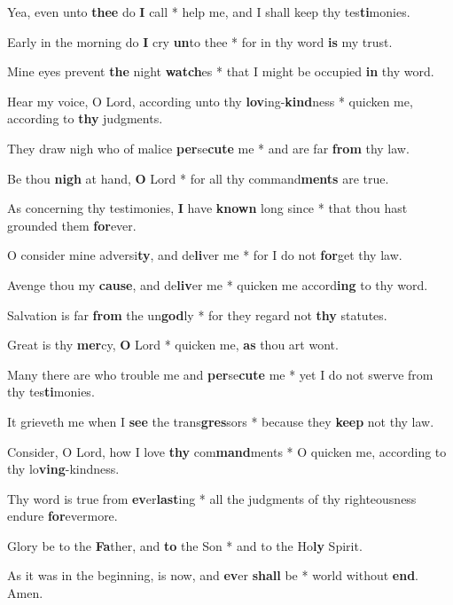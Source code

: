 \begin{multicols}{2}
	Yea, even unto \textbf{thee} do \textbf{I} call * help me, and I shall keep thy tes\textbf{ti}monies.
	
	Early in the morning do \textbf{I} cry \textbf{un}to thee * for in thy word \textbf{is} my trust.
	
	Mine eyes prevent \textbf{the} night \textbf{watch}es * that I might be occupied \textbf{in} thy word.
	
	Hear my voice, O Lord, according unto thy \textbf{lov}ing-\textbf{kind}ness * quicken me, according to \textbf{thy} judgments.
	
	They draw nigh who of malice \textbf{per}se\textbf{cute} me * and are far \textbf{from} thy law.
	
	Be thou \textbf{nigh} at hand, \textbf{O} Lord * for all thy command\textbf{ments} are true.
	
	As concerning thy testimonies, \textbf{I} have \textbf{known} long since * that thou hast grounded them \textbf{for}ever.
	
	O consider mine adversi\textbf{ty}, and de\textbf{li}ver me * for I do not \textbf{for}get thy law.
	
	Avenge thou my \textbf{cause}, and de\textbf{liv}er me * quicken me accord\textbf{ing} to thy word.
	
	Salvation is far \textbf{from} the un\textbf{god}ly * for they regard not \textbf{thy} statutes.
	
	Great is thy \textbf{mer}cy, \textbf{O} Lord * quicken me, \textbf{as} thou art wont.
	
	Many there are who trouble me and \textbf{per}se\textbf{cute} me * yet I do not swerve from thy tes\textbf{ti}monies.
	
	It grieveth me when I \textbf{see} the trans\textbf{gres}sors * because they \textbf{keep} not thy law.
	
	Consider, O Lord, how I love \textbf{thy} com\textbf{mand}ments * O quicken me, according to thy lo\textbf{ving}-kindness.
	
	Thy word is true from \textbf{ev}er\textbf{last}ing * all the judgments of thy righteousness endure \textbf{for}evermore.
	
	Glory be to the \textbf{Fa}ther, and \textbf{to} the Son * and to the Ho\textbf{ly} Spirit.
	
	As it was in the beginning, is now, and \textbf{ev}er \textbf{shall} be * world without \textbf{end}. Amen.
\end{multicols}